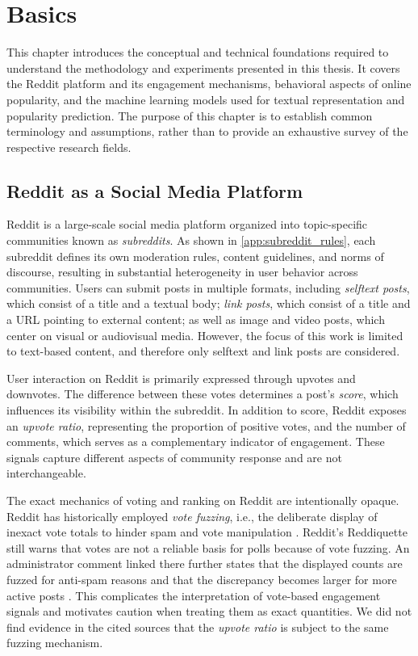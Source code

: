 \chapter{Basics}
\label{chap:basics}
This chapter introduces the conceptual and technical foundations required to understand the methodology and experiments presented in this thesis. It covers the Reddit platform and its engagement mechanisms, behavioral aspects of online popularity, and the machine learning models used for textual representation and popularity prediction. The purpose of this chapter is to establish common terminology and assumptions, rather than to provide an exhaustive survey of the respective research fields.

\section{Reddit as a Social Media Platform}

Reddit is a large-scale social media platform organized into topic-specific communities known as \emph{subreddits}. As shown in \autoref{app:subreddit_rules}, each subreddit defines its own moderation rules, content guidelines, and norms of discourse, resulting in substantial heterogeneity in user behavior across communities. Users can submit posts in multiple formats, including \emph{selftext posts}, which consist of a title and a textual body; \emph{link posts}, which consist of a title and a URL pointing to external content; as well as image and video posts, which center on visual or audiovisual media. However, the focus of this work is limited to text-based content, and therefore only selftext and link posts are considered.

User interaction on Reddit is primarily expressed through upvotes and downvotes. The difference between these votes determines a post’s \emph{score}, which influences its visibility within the subreddit. In addition to score, Reddit exposes an \emph{upvote ratio}, representing the proportion of positive votes, and the number of comments, which serves as a complementary indicator of engagement. These signals capture different aspects of community response and are not interchangeable.


The exact mechanics of voting and ranking on Reddit are intentionally opaque. Reddit has historically employed \emph{vote fuzzing}, i.e., the deliberate display of inexact vote totals to hinder spam and vote manipulation \cite{stoddard2015popularity,redditReddiquette,redditJedbergVoteFuzzing}. Reddit’s Reddiquette still warns that votes are not a reliable basis for polls because of vote fuzzing. An administrator comment linked there further states that the displayed counts are fuzzed for anti-spam reasons and that the discrepancy becomes larger for more active posts \cite{redditReddiquette,redditJedbergVoteFuzzing}. This complicates the interpretation of vote-based engagement signals and motivates caution when treating them as exact quantities. We did not find evidence in the cited sources that the \textit{upvote ratio} is subject to the same fuzzing mechanism.

